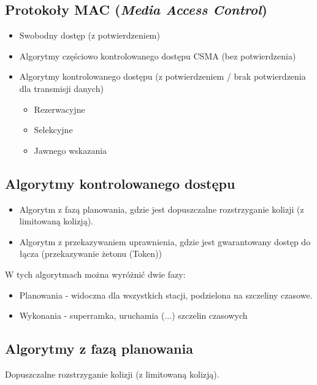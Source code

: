 \documentclass[a4paper,twoside]{article}
\begin{document}
	\subsection{Protokoły MAC (\emph{Media Access Control})}
		\begin{itemize}
			\item Swobodny dostęp (z potwierdzeniem)
			\item Algorytmy częściowo kontrolowanego dostępu CSMA (bez potwierdzenia)
			\item Algorytmy kontrolowanego dostępu (z potwierdzeniem / brak potwierdzenia dla transmisji danych)
			\begin{itemize}
				\item Rezerwacyjne
				\item Selekcyjne
				\item Jawnego wskazania
			\end{itemize}
		\end{itemize}
	\subsection{Algorytmy kontrolowanego dostępu}
		\begin{itemize}
			\item Algorytm z fazą planowania, gdzie jest dopuszczalne rozstrzyganie kolizji (z limitowaną kolizją).
			\item Algorytm z przekazywaniem uprawnienia, gdzie jest gwarantowany dostęp do łącza (przekazywanie żetonu (Token))
		\end{itemize}
		W tych algorytmach można wyróżnić dwie fazy:
		\begin{itemize}
			\item Planowania - widoczna dla wszystkich stacji, podzielona na szczeliny czasowe.
			\item Wykonania - superramka, uruchamia (...) szczelin czasowych
		\end{itemize}
	\subsection{Algorytmy z fazą planowania}
		Dopuszczalne rozstrzyganie kolizji (z limitowaną kolizją).
\end{document}
